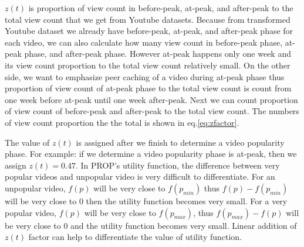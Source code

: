 \documentclass[10pt,final,journal,a4paper]{IEEEtran}
\begin{document}
$z(t)$ is proportion of view count in before-peak, at-peak, and after-peak to the total view count that we get from Youtube datasets.  
Because from transformed Youtube dataset we already have before-peak, at-peak, and after-peak phase for each video, we can also calculate how many view count in before-peak phase, at-peak phase, and after-peak phase.  
However at-peak happens only one week and its view count proportion to the total view count relatively small.
On the other side, we want to emphasize peer caching of a video during at-peak phase thus proportion of view count of at-peak phase to the total view count is count from one week before at-peak until one week after-peak.
Next we can count proportion of view count of before-peak and after-peak to the total view count.
The numbers of view count proportion the the total is shown in eq.\ref{eq:zfactor}.

The value of $z(t)$ is assigned after we finish to determine a video popularity phase.  
For example: if we determine a video popularity phase is at-peak, then we assign $z(t)=0.47$.
In PROP's utility function, the difference between very popular videos and unpopular video is very difficult to differentiate. 
For an unpopular video, $f(p)$ will be very close to $f(p_{min})$ thus $f(p) - f(p_{min})$ will be very close to $0$ then the utility function becomes very small.
For a very popular video, $f(p)$ will be very close to $f(p_{max})$, thus $f(p_{max}) - f(p)$ will be very close to $0$ and the  utility function becomes very small.  
Linear addition of $z(t)$ factor can help to differentiate the value of utility function.
\end{document}
